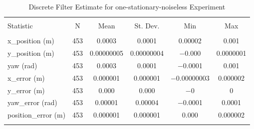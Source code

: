 
\begin{table}[htbp] \centering 
  \caption{Discrete Filter Estimate for one-stationary-noiseless Experiment} 
  \label{tab:one_stationary_noiseless_discrete_summary} 
\begin{tabular}{@{\extracolsep{5pt}}lccccc} 
\\[-1.8ex]\hline 
\hline \\[-1.8ex] 
Statistic & \multicolumn{1}{c}{N} & \multicolumn{1}{c}{Mean} & \multicolumn{1}{c}{St. Dev.} & \multicolumn{1}{c}{Min} & \multicolumn{1}{c}{Max} \\ 
\hline \\[-1.8ex] 
x\_position (m) & 453 & \num{0.0003} & \num{0.0001} & \num{0.00002} & \num{0.001} \\ 
y\_position (m) & 453 & \num{0.00000005} & \num{0.00000004} & \num{-0.000} & \num{0.0000001} \\ 
yaw (rad) & 453 & \num{0.0003} & \num{0.0001} & \num{-0.0001} & \num{0.001} \\ 
x\_error (m) & 453 & \num{0.000001} & \num{0.000001} & \num{-0.00000003} & \num{0.000002} \\ 
y\_error (m) & 453 & \num{0.000} & \num{0.000} & $-$0 & 0 \\ 
yaw\_error (rad) & 453 & \num{0.00001} & \num{0.00004} & \num{-0.0001} & \num{0.0001} \\ 
position\_error (m) & 453 & \num{0.000001} & \num{0.000001} & \num{0.000} & \num{0.000002} \\ 
\hline \\[-1.8ex] 
\end{tabular} 
\end{table} 
